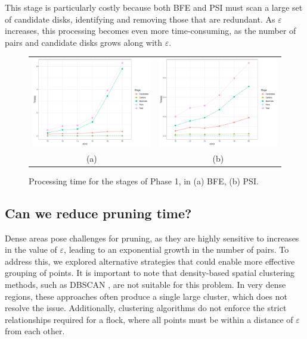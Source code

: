 This stage is particularly costly because both BFE and PSI must scan a large set of candidate disks, identifying and removing those that are redundant. As $\varepsilon$ increases, this processing becomes even more time-consuming, as the number of pairs and candidate disks grows along with $\varepsilon$.

\begin{figure}
    \centering
    \begin{tabular}{c c}
        \includegraphics[width=0.49\linewidth] {figures/plots/09_dense_stages/dense_stages_bfe.pdf} &
        \includegraphics[width=0.49\linewidth] {figures/plots/09_dense_stages/dense_stages_psi.pdf} \\
        (a) & (b) \\
    \end{tabular}
    \caption{Processing time for the stages of Phase 1, in (a) BFE, (b) PSI.}\label{fig:dense_stages}
\end{figure}

\subsection{Can we reduce pruning time?}
Dense areas pose challenges for pruning, as they are highly sensitive to increases in the value of $\varepsilon$, leading to an exponential growth in the number of pairs. To address this, we explored alternative strategies that could enable more effective grouping of points. It is important to note that density-based spatial clustering methods, such as DBSCAN \cite{dbscan}, are not suitable for this problem. In very dense regions, these approaches often produce a single large cluster, which does not resolve the issue. Additionally, clustering algorithms do not enforce the strict relationships required for a flock, where all points must be within a distance of $\varepsilon$ from each other.

